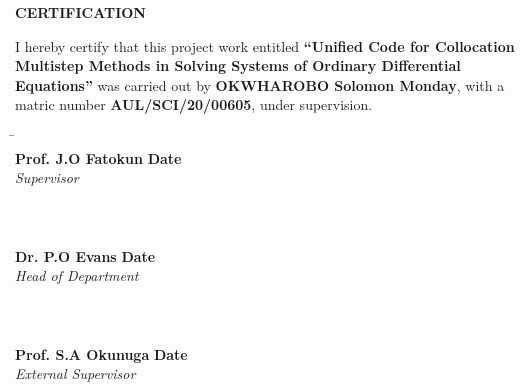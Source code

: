 \documentclass[13pt,a4paper]{article}
\begin{document}
\setcounter{page}{2}

\vspace{1cm}

\begin{center}
    \textbf{\large CERTIFICATION}
\end{center}

\vspace{1cm}

\noindent
I hereby certify that this project work entitled \textbf{“Unified Code for Collocation Multistep Methods in Solving Systems of Ordinary Differential Equations”} was carried out by \textbf{OKWHAROBO Solomon Monday}, with a matric number \textbf{AUL/SCI/20/00605}, under supervision.

\vfill

\noindent
\begin{tabbing}
    \hspace{8cm} \= \hspace{8cm} \kill
    \makebox[6cm]{\hrulefill} \> \makebox[6cm]{\hrulefill} \\
    \textbf{Prof. J.O Fatokun} \> \textbf{Date} \\
    \textit{Supervisor} \\
    \\
    \\
    \makebox[6cm]{\hrulefill} \> \makebox[6cm]{\hrulefill} \\
    \textbf{Dr. P.O Evans} \> \textbf{Date} \\
    \textit{Head of Department} \\
    \\
    \\
    \makebox[6cm]{\hrulefill} \> \makebox[6cm]{\hrulefill} \\
    \textbf{Prof. S.A Okunuga} \> \textbf{Date} \\
    \textit{External Supervisor} \\
\end{tabbing}
\end{document}
